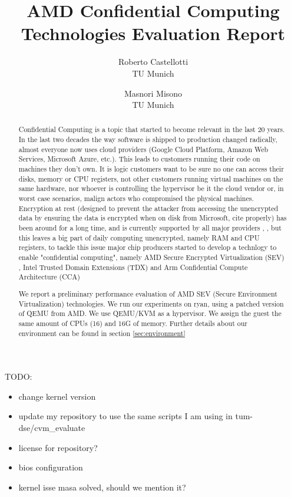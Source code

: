 \documentclass[twocolumn]{article}
\begin{document}
\date{}
\title{\Large \bf AMD Confidential Computing Technologies Evaluation Report}
\author{{\rm Roberto Castellotti}\\TU Munich \and {\rm Masnori Misono}\\TU Munich}
\maketitle
TODO:
\begin{itemize}
    \item change kernel version
    \item update my repository to use the same scripts I am using in tum-dse/cvm\_evaluate
    \item license for repository?
    \item bios configuration
    \item kernel isse masa solved, should we mention it?
\end{itemize}

\begin{abstract}
    Confidential Computing is a topic that started to become relevant in the last 20 years. In the last two decades the way software is shipped to production changed radically, almost everyone now uses cloud providers (Google Cloud Platform, Amazon Web Services, Microsoft Azure, etc.). This leads to customers running their code on machines they don't own. It is logic customers want to be sure no one can access their disks, memory or CPU registers, not other customers running virtual machines on the same hardware, nor whoever is controlling the hypervisor be it  the cloud vendor  or, in worst case scenarios, malign actors who compromised the physical machines. Encryption at rest (designed to prevent the attacker from accessing the unencrypted data by ensuring the data is encrypted when on disk from Microsoft, cite properly) has been around for a long time, and is currently supported by all major providers \cite{aws-enc}, \cite{gcp-enc}, \cite{azure-enc} but this leaves a big part of daily computing unencrypted, namely RAM and CPU registers, to tackle this issue major chip producers started to develop a technlogy to enable "confidential computing", 
    namely AMD Secure Encrypted Virtualization (SEV) \cite{memory-encryption}, Intel Trusted Domain Extensions (TDX) \cite{tdx} and Arm Confidential Compute Architecture (CCA) \cite{cca}

    We report a preliminary performance evaluation of AMD SEV (Secure Environment Virtualization) technologies.
    We run our experiments on ryan, using a patched version of QEMU from AMD. We use QEMU/KVM as a hypervisor. We assign the guest the same amount of CPUs (16) and 16G of memory. Further details about our environment can be found in section \ref{sec:environment}

\end{abstract}
\end{document}
